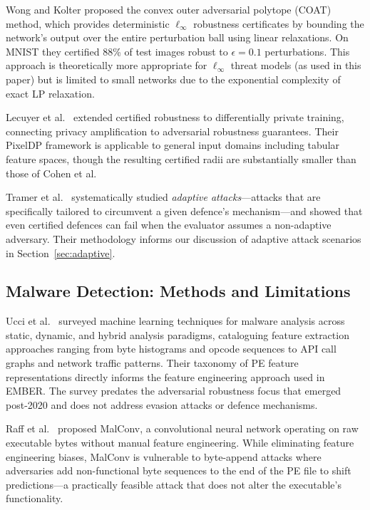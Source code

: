 \documentclass[conference]{IEEEtran}
\begin{document}
Wong and Kolter \cite{wongkolter2018} proposed the convex outer adversarial polytope (COAT) method, which provides deterministic $\ell_\infty$ robustness certificates by bounding the network's output over the entire perturbation ball using linear relaxations. On MNIST they certified 88\% of test images robust to $\epsilon = 0.1$ perturbations. This approach is theoretically more appropriate for $\ell_\infty$ threat models (as used in this paper) but is limited to small networks due to the exponential complexity of exact LP relaxation.

Lecuyer et al.\ \cite{lecuyer2019} extended certified robustness to differentially private training, connecting privacy amplification to adversarial robustness guarantees. Their PixelDP framework is applicable to general input domains including tabular feature spaces, though the resulting certified radii are substantially smaller than those of Cohen et al.

Tramer et al.\ \cite{tramer2020} systematically studied \emph{adaptive attacks}---attacks that are specifically tailored to circumvent a given defence's mechanism---and showed that even certified defences can fail when the evaluator assumes a non-adaptive adversary. Their methodology informs our discussion of adaptive attack scenarios in Section~\ref{sec:adaptive}.

\subsection{Malware Detection: Methods and Limitations}

Ucci et al.\ \cite{ucci2019} surveyed machine learning techniques for malware analysis across static, dynamic, and hybrid analysis paradigms, cataloguing feature extraction approaches ranging from byte histograms and opcode sequences to API call graphs and network traffic patterns. Their taxonomy of PE feature representations directly informs the feature engineering approach used in EMBER. The survey predates the adversarial robustness focus that emerged post-2020 and does not address evasion attacks or defence mechanisms.

Raff et al.\ \cite{raff2020} proposed MalConv, a convolutional neural network operating on raw executable bytes without manual feature engineering. While eliminating feature engineering biases, MalConv is vulnerable to byte-append attacks where adversaries add non-functional byte sequences to the end of the PE file to shift predictions---a practically feasible attack that does not alter the executable's functionality.
\end{document}
